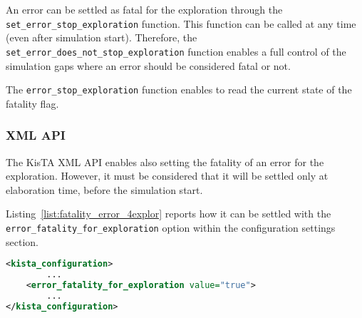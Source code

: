 An error can be settled as fatal for the exploration through the \texttt{set\_error\_stop\_exploration} function.
This function can be called at any time (even after simulation start).
%
Therefore, the \texttt{set\_error\_does\_not\_stop\_exploration} function enables a full control of the simulation gaps
where an error should be considered fatal or not.

The \texttt{error\_stop\_exploration} function enables to read the current state of the fatality flag.

\subsubsection{XML API}
\label{sec:error_fatality_for_exploration}

The KisTA XML API enables also setting the fatality of an error for the exploration.
%
However, it must be considered that it will be settled only at elaboration time, before the simulation start.
%

Listing~\ref{list:fatality_error_4explor} reports how it can be settled with the \texttt{error\_fatality\_for\_exploration} option
within the configuration settings section.

\begin{lstlisting}[language=XML, caption={Setting the fatality for the exploration from the XML interface.}, label=list:xml_fatality_setting]
<kista_configuration>
        ...
    <error_fatality_for_exploration value="true">
        ...
</kista_configuration>
\end{lstlisting}

